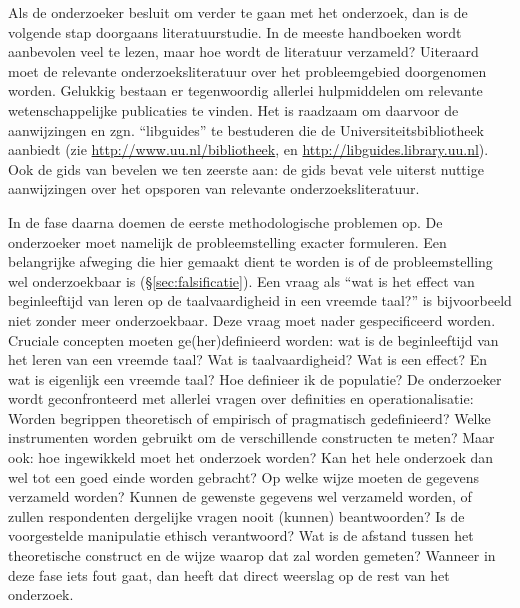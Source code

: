 \documentclass[
]{book}
\begin{document}
Als de onderzoeker besluit om verder te gaan met het onderzoek, dan is
de volgende stap doorgaans literatuurstudie. In de meeste handboeken
wordt aanbevolen veel te lezen, maar hoe wordt de literatuur verzameld?
Uiteraard moet de relevante onderzoeksliteratuur over het probleemgebied
doorgenomen worden. Gelukkig bestaan er tegenwoordig allerlei
hulpmiddelen om relevante wetenschappelijke publicaties te vinden. Het
is raadzaam om daarvoor de aanwijzingen en zgn. ``libguides'' te
bestuderen die de Universiteitsbibliotheek aanbiedt (zie
\url{http://www.uu.nl/bibliotheek}, en \url{http://libguides.library.uu.nl}).
Ook de gids van \citep{Sand11} bevelen we ten zeerste aan: de gids bevat vele uiterst
nuttige aanwijzingen over het opsporen van relevante
onderzoeksliteratuur.

In de fase daarna doemen de eerste methodologische problemen op. De
onderzoeker moet namelijk de probleemstelling exacter formuleren. Een
belangrijke afweging die hier gemaakt dient te worden is of de
probleemstelling wel onderzoekbaar is (§\ref{sec:falsificatie}).
Een vraag als ``wat is het effect van
beginleeftijd van leren op de taalvaardigheid in een vreemde taal?'' is
bijvoorbeeld niet zonder meer onderzoekbaar. Deze vraag moet nader
gespecificeerd worden. Cruciale concepten moeten ge(her)definieerd
worden: wat is de beginleeftijd van het leren van een vreemde taal? Wat is taalvaardigheid? Wat is een effect? En wat is eigenlijk een vreemde taal? Hoe definieer ik de populatie?
De onderzoeker wordt geconfronteerd
met allerlei vragen over definities en operationalisatie: Worden
begrippen theoretisch of empirisch of pragmatisch gedefinieerd? Welke
instrumenten worden gebruikt om de verschillende constructen te meten?
Maar ook: hoe ingewikkeld moet het onderzoek worden? Kan het hele
onderzoek dan wel tot een goed einde worden gebracht? Op welke wijze
moeten de gegevens verzameld worden? Kunnen de gewenste gegevens wel
verzameld worden, of zullen respondenten dergelijke vragen nooit
(kunnen) beantwoorden? Is de voorgestelde manipulatie ethisch
verantwoord? Wat is de afstand tussen het theoretische construct en de
wijze waarop dat zal worden gemeten? Wanneer in deze fase iets fout
gaat, dan heeft dat direct weerslag op de rest van het onderzoek.
\end{document}
